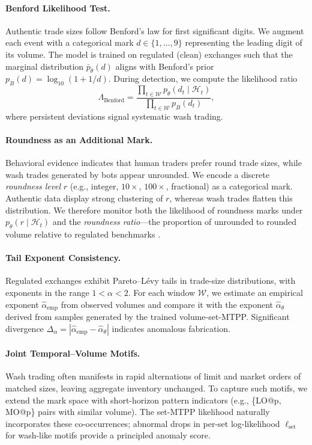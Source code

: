 \paragraph{Benford Likelihood Test.} 
Authentic trade sizes follow Benford’s law for first significant digits. We augment each event with a categorical mark $d \in \{1,\dots,9\}$ representing the leading digit of its volume. The model is trained on regulated (clean) exchanges such that the marginal distribution $\bar{p}_\theta(d)$ aligns with Benford’s prior $p_{B}(d)=\log_{10}(1+1/d)$. During detection, we compute the likelihood ratio
\[
\Lambda_{\text{Benford}} = \frac{\prod_{t \in \mathcal{W}} p_\theta(d_t \mid \mathcal{H}_t)}{\prod_{t \in \mathcal{W}} p_{B}(d_t)},
\]
where persistent deviations signal systematic wash trading.

\paragraph{Roundness as an Additional Mark.}
Behavioral evidence indicates that human traders prefer round trade sizes, while wash trades generated by bots appear unrounded. We encode a discrete \emph{roundness level} $r$ (e.g., integer, $10\times$, $100\times$, fractional) as a categorical mark. Authentic data display strong clustering of $r$, whereas wash trades flatten this distribution. We therefore monitor both the likelihood of roundness marks under $p_\theta(r\mid \mathcal{H}_t)$ and the \emph{roundness ratio}---the proportion of unrounded to rounded volume relative to regulated benchmarks \cite{Cong2022}.

\paragraph{Tail Exponent Consistency.}
Regulated exchanges exhibit Pareto–Lévy tails in trade-size distributions, with exponents in the range $1 < \alpha < 2$. For each window $\mathcal{W}$, we estimate an empirical exponent $\hat{\alpha}_{\text{emp}}$ from observed volumes and compare it with the exponent $\hat{\alpha}_\theta$ derived from samples generated by the trained volume-set-MTPP. Significant divergence $\Delta_\alpha = |\hat{\alpha}_{\text{emp}} - \hat{\alpha}_\theta|$ indicates anomalous fabrication.

\paragraph{Joint Temporal--Volume Motifs.}
Wash trading often manifests in rapid alternations of limit and market orders of matched sizes, leaving aggregate inventory unchanged. To capture such motifs, we extend the mark space with short-horizon pattern indicators (e.g., \{LO@p, MO@p\} pairs with similar volume). The set-MTPP likelihood naturally incorporates these co-occurrences; abnormal drops in per-set log-likelihood $\ell_{\text{set}}$ for wash-like motifs provide a principled anomaly score.

